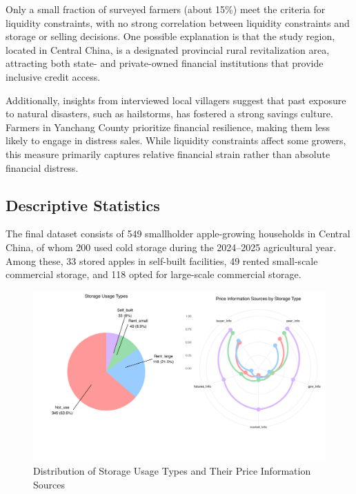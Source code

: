 Only a small fraction of surveyed farmers (about 15\%) meet the criteria for liquidity constraints, with no strong correlation between liquidity constraints and storage or selling decisions. One possible explanation is that the study region, located in Central China, is a designated provincial rural revitalization area, attracting both state- and private-owned financial institutions that provide inclusive credit access.  

Additionally, insights from interviewed local villagers suggest that past exposure to natural disasters, such as hailstorms, has fostered a strong savings culture. Farmers in Yanchang County prioritize financial resilience, making them less likely to engage in distress sales. While liquidity constraints affect some growers, this measure primarily captures relative financial strain rather than absolute financial distress.  




\subsection{Descriptive Statistics}  
\noindent The final dataset consists of 549 smallholder apple-growing households in Central China, of whom 200 used cold storage during the 2024–2025 agricultural year. Among these, 33 stored apples in self-built facilities, 49 rented small-scale commercial storage, and 118 opted for large-scale commercial storage.  

\begin{figure}[htp]
\centering
\includegraphics[width=1\textwidth]{figures/storage_usage_analysis_soft_colors.png}
\caption{Distribution of Storage Usage Types and Their Price Information Sources}
\label{Figure: pie and radar chart}
\end{figure}

